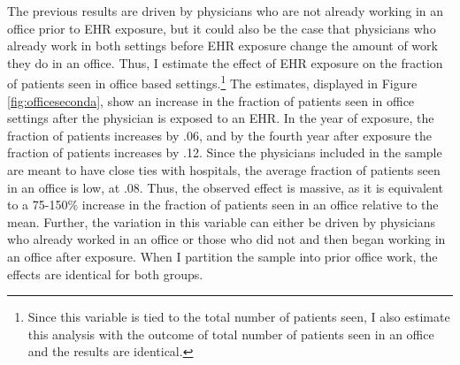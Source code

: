 \documentclass[12pt]{article}
\begin{document}
The previous results are driven by physicians who are not already working in an office prior to EHR exposure, but it could also be the case that physicians who already work in both settings before EHR exposure change the amount of work they do in an office. Thus, I estimate the effect of EHR exposure on the fraction of patients seen in office based settings.\footnote{Since this variable is tied to the total number of patients seen, I also estimate this analysis with the outcome of total number of patients seen in an office and the results are identical.} The estimates, displayed in Figure \ref{fig:officeseconda}, show an increase in the fraction of patients seen in office settings after the physician is exposed to an EHR. In the year of exposure, the fraction of patients increases by .06, and by the fourth year after exposure the fraction of patients increases by .12. Since the physicians included in the sample are meant to have close ties with hospitals, the average fraction of patients seen in an office is low, at .08. Thus, the observed effect is massive, as it is equivalent to a 75-150\% increase in the fraction of patients seen in an office relative to the mean. Further, the variation in this variable can either be driven by physicians who already worked in an office or those who did not and then began working in an office after exposure. When I partition the sample into prior office work, the effects are identical for both groups. 
\end{document}

